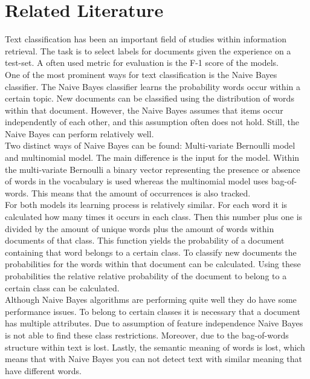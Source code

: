 \documentclass[a4paper]{article}
\begin{document}

\section{Related Literature}
Text classification has been an important field of studies within information retrieval. The task is to select labels for documents given the experience on a test-set. A often used metric for evaluation is the F-1 score of the models. \cite{allahyari2017brief}\\
One of the most prominent ways for text classification is the Naive Bayes classifier. The Naive Bayes classifier learns the probability words occur within a certain topic. New documents can be classified using the distribution of words within that document. However, the Naive Bayes assumes that items occur independently of each other, and this assumption often does not hold. Still, the Naive Bayes can perform relatively well. \cite{allahyari2017brief}\\
Two distinct ways of Naive Bayes can be found: Multi-variate Bernoulli model and multinomial model. The main difference is the input for the model. Within the multi-variate Bernoulli a binary vector representing the presence or absence of words in the vocabulary is used whereas the multinomial model uses bag-of-words. This means that the amount of occurrences is also tracked. \cite{mccallum1998comparison} \\
For both models its learning process is relatively similar. For each word it is calculated how many times it occurs in each class. Then this number plus one is divided by the amount of unique words plus the amount of words within documents of that class. This function yields the probability of a document containing that word belongs to a certain class. To classify new documents the probabilities for the words within that document can be calculated. Using these probabilities the relative relative probability of the document to belong to a certain class can be calculated. \cite{mccallum1998comparison}\\
Although Naive Bayes algorithms are performing quite well they do have some performance issues. To belong to certain classes it is necessary that a document has multiple attributes. Due to assumption of feature independence Naive Bayes is not able to find these class restrictions. Moreover, due to the bag-of-words structure within text is lost. Lastly, the semantic meaning of words is lost, which means that with Naive Bayes you can not detect text with similar meaning that have different words.\\
\end{document}

